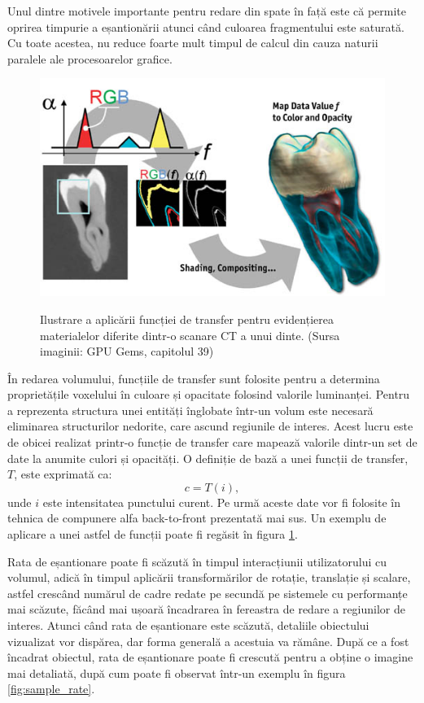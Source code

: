 Unul dintre motivele importante pentru redare din spate în față este că permite oprirea timpurie a eșantionării atunci când culoarea fragmentului este saturată. Cu toate acestea, nu reduce foarte mult timpul de calcul din cauza naturii paralele ale procesoarelor grafice.

\begin{figure}[!htb]
    \centering
    \includegraphics[width=12cm]{images/ilustrare_tf.jpg}
    \\
    \caption{Ilustrare a aplicării funcției de transfer pentru evidențierea materialelor diferite dintr-o scanare CT a unui dinte. (Sursa imaginii: GPU Gems, capitolul 39\cite{gpugems39})}
    \label{fig:ilustr_tf}
\end{figure}

În redarea volumului, funcțiile de transfer \cite{kniss2002} sunt folosite pentru a determina proprietățile voxelului în culoare și opacitate folosind valorile luminanței. Pentru a reprezenta structura unei entități înglobate într-un volum este necesară eliminarea structurilor nedorite, care ascund regiunile de interes. Acest lucru este de obicei realizat printr-o funcție de transfer care mapează valorile dintr-un set de date la anumite culori și opacități. O definiție de bază a unei funcții de transfer, $T$, este exprimată ca:
\begin{equation}
    c = T(i),
\end{equation}
unde $i$ este intensitatea punctului curent. Pe urmă aceste date vor fi folosite în tehnica de compunere alfa back-to-front prezentată mai sus. Un exemplu de aplicare a unei astfel de funcții poate fi regăsit în figura \ref{fig:ilustr_tf}.

Rata de eșantionare poate fi scăzută în timpul interacțiunii utilizatorului cu volumul, adică în timpul aplicării transformărilor de rotație, translație și scalare, astfel crescând numărul de cadre redate pe secundă pe sistemele cu performanțe mai scăzute, făcând mai ușoară încadrarea în fereastra de redare a regiunilor de interes. Atunci când rata de eșantionare este scăzută, detaliile obiectului vizualizat vor dispărea, dar forma generală a acestuia va rămâne. După ce a fost încadrat obiectul, rata de eșantionare poate fi crescută pentru a obține o imagine mai detaliată, după cum poate fi observat într-un exemplu în figura \ref{fig:sample_rate}. 

